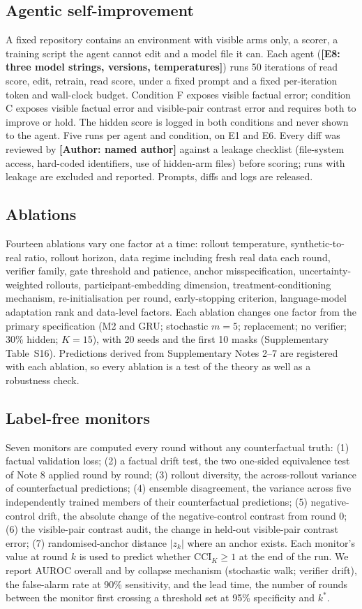 \documentclass[11pt,a4paper]{article}
\newcommand{\tbd}[1]{{\color{red}\textbf{[#1]}}}
\newcommand{\authorpending}[1]{{\color{red}\textbf{[Author: #1]}}}
\newcommand{\CCI}{\mathrm{CCI}}
\begin{document}
\subsection{Agentic self-improvement}
A fixed repository contains an environment with visible arms only, a scorer, a training script the agent cannot edit and a model file it can. Each agent (\tbd{E8: three model strings, versions, temperatures}) runs 50 iterations of read score, edit, retrain, read score, under a fixed prompt and a fixed per-iteration token and wall-clock budget. Condition F exposes visible factual error; condition C exposes visible factual error and visible-pair contrast error and requires both to improve or hold. The hidden score is logged in both conditions and never shown to the agent. Five runs per agent and condition, on E1 and E6. Every diff was reviewed by \authorpending{named author} against a leakage checklist (file-system access, hard-coded identifiers, use of hidden-arm files) before scoring; runs with leakage are excluded and reported. Prompts, diffs and logs are released.

\subsection{Ablations}
Fourteen ablations vary one factor at a time: rollout temperature, synthetic-to-real ratio, rollout horizon, data regime including fresh real data each round, verifier family, gate threshold and patience, anchor misspecification, uncertainty-weighted rollouts, participant-embedding dimension, treatment-conditioning mechanism, re-initialisation per round, early-stopping criterion, language-model adaptation rank and data-level factors. Each ablation changes one factor from the primary specification (M2 and GRU; stochastic $m=5$; replacement; no verifier; 30\% hidden; $K=15$), with 20 seeds and the first 10 masks (Supplementary Table~S16). Predictions derived from Supplementary Notes 2--7 are registered with each ablation, so every ablation is a test of the theory as well as a robustness check.

\subsection{Label-free monitors}
Seven monitors are computed every round without any counterfactual truth: (1) factual validation loss; (2) a factual drift test, the two one-sided equivalence test of Note 8 applied round by round; (3) rollout diversity, the across-rollout variance of counterfactual predictions; (4) ensemble disagreement, the variance across five independently trained members of their counterfactual predictions; (5) negative-control drift, the absolute change of the negative-control contrast from round 0; (6) the visible-pair contrast audit, the change in held-out visible-pair contrast error; (7) randomised-anchor distance $|z_k|$ where an anchor exists. Each monitor's value at round $k$ is used to predict whether $\CCI_K\ge1$ at the end of the run. We report AUROC overall and by collapse mechanism (stochastic walk; verifier drift), the false-alarm rate at 90\% sensitivity, and the lead time, the number of rounds between the monitor first crossing a threshold set at 95\% specificity and $k^*$.
\end{document}
